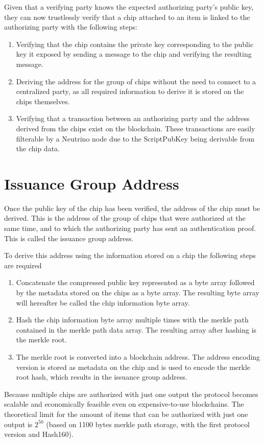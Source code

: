 \documentclass[twocolumn,titlepage]{article}
\begin{document}
Given that a verifying party knows the expected authorizing party's public key, they can now trustlessly verify that a chip attached to an item is linked to the authorizing party with the following steps:
\begin{enumerate}
    \item Verifying that the chip contains the private key corresponding to the public key it exposed by sending a message to the chip and verifying the resulting message.
    \item Deriving the address for the group of chips without the need to connect to a centralized party, as all required information to derive it is stored on the chips themselves.
    \item Verifying that a transaction between an authorizing party and the address derived from the chips exist on the blockchain. These transactions are easily filterable by a Neutrino node due to the ScriptPubKey being derivable from the chip data.
\end{enumerate}

\section{Issuance Group Address}
Once the public key of the chip has been verified, the address of the chip must be derived. This is the address of the group of chips that were authorized at the same time, and to which the authorizing party has sent an authentication proof. This is called the issuance group address.

To derive this address using the information stored on a chip the following steps are required
\begin{enumerate}
    \item Concatenate the compressed public key represented as a byte array followed by the metadata stored on the chips as a byte array. The resulting byte array will hereafter be called the chip information byte array.
    \item Hash the chip information byte array multiple times with the merkle path contained in the merkle path data array. The resulting array after  hashing is the merkle root.
    \item The merkle root is converted into a blockchain address. The address encoding version is stored as metadata on the chip and is used to encode the merkle root hash, which results in the issuance group address.
\end{enumerate}

Because multiple chips are authorized with just one output the protocol becomes scalable and economically feasible even on expensive-to-use blockchains. The theoretical limit for the amount of items that can be authorized with just one output is $2^{50}$ (based on 1100 bytes merkle path storage, with the first protocol version and Hash160).
\end{document}
